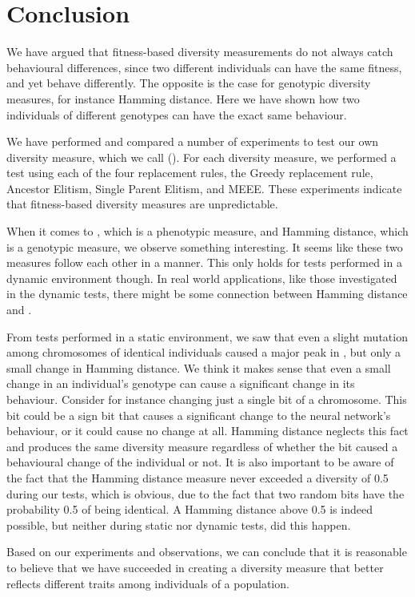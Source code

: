 \section{Conclusion}\label{sec:conclusion}
We have argued that fitness-based diversity measurements do not always catch behavioural differences, since two different individuals can have the same fitness, and yet behave differently.
The opposite is the case for genotypic diversity measures, for instance Hamming distance.
Here we have shown how two individuals of different genotypes can have the exact same behaviour.

We have performed and compared a number of experiments to test our own diversity measure, which we call \di{} (\dia{}).
For each diversity measure, we performed a test using each of the four replacement rules, the Greedy replacement rule, Ancestor Elitism, Single Parent Elitism, and MEEE.
These experiments indicate that fitness-based diversity measures are unpredictable.

When it comes to \dia{}, which is a phenotypic measure, and Hamming distance, which is a genotypic measure, we observe something interesting. It seems like these two measures follow each other in a manner.
This only holds for tests performed in a dynamic environment though. 
In real world applications, like those investigated in the dynamic tests, there might be some connection between Hamming distance and \dia{}.

From tests performed in a static environment, we saw that even a slight mutation among chromosomes of identical individuals caused a major peak in \dia{}, but only a small change in Hamming distance.
We think it makes sense that even a small change in an individual's genotype can cause a significant change in its behaviour. Consider for instance changing just a single bit of a chromosome. This bit could be a sign bit that causes a significant change to the neural network's behaviour, or it could cause no change at all.
Hamming distance neglects this fact and produces the same diversity measure regardless of whether the bit caused a behavioural change of the individual or not.
It is also important to be aware of the fact that the Hamming distance measure never exceeded a diversity of \num{0.5} during our tests, which is obvious, due to the fact that two random bits have the probability \num{0.5} of being identical.
A Hamming distance above \num{0.5} is indeed possible, but neither during static nor dynamic tests, did this happen. 

Based on our experiments and observations, we can conclude that it is reasonable to believe that we have succeeded in creating a diversity measure that better reflects different traits among individuals of a population.

